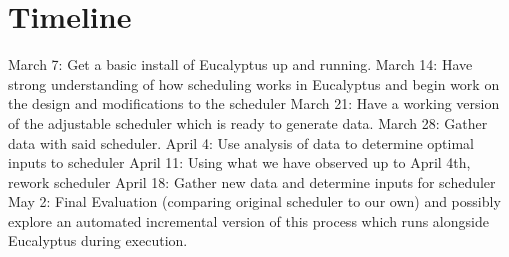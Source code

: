 \section{Timeline}
March 7: Get a basic install of Eucalyptus up and running.
March 14: Have strong understanding of how scheduling works in Eucalyptus and begin work on the design and modifications to the scheduler
March 21: Have a working version of the adjustable scheduler which is ready to generate data.
March 28: Gather data with said scheduler.
April 4: Use analysis of data to determine optimal inputs to scheduler
April 11: Using what we have observed up to April 4th, rework scheduler
April 18: Gather new data and determine inputs for scheduler
May 2: Final Evaluation (comparing original scheduler to our own) and possibly explore an automated incremental version of this process which runs alongside Eucalyptus during execution.
